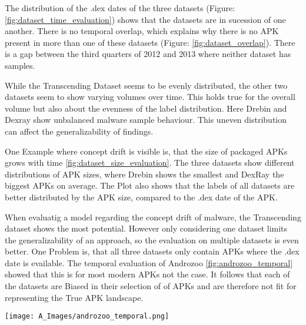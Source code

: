The distribution of the .dex dates of the three datasets (Figure: \ref{fig:dataset_time_evaluation}) shows that the datasets are in sucession of one another. 
There is no temporal overlap, which explains why there is no APK present in more than one of these datasets (Figure: \ref{fig:dataset_overlap}). 
There is a gap between the third quarters of 2012 and 2013 where neither dataset has samples. 

While the Transcending Dataset seems to be evenly distributed, the other two datasets seem to show varying volumes over time. 
This holds true for the overall volume but also about the evenness of the label distribution. 
Here Drebin and Dexray show unbalanced malware sample behaviour. 
This uneven distribution can affect the generalizability of findings.

One Example where concept drift is visible is, that the size of packaged APKs grows with time \ref{fig:dataset_size_evaluation}.
The three datasets show different distributions of APK sizes, where Drebin shows the smallest and DexRay the biggest APKs on average.
The Plot also shows that the labels of all datasets are better distributed by the APK size, compared to the .dex date of the APK.

When evaluatig a model regarding the concept drift of malware, the Transcending dataset shows the most potential.
However only considering one dataset limits the generalizability of an approach, so the evaluation on multiple datasets is even better.
One Problem is, that all three datasets only contain APKs where the .dex date is evailable.
The temporal evaluation of Androzoo \ref{fig:androzoo_temporal} showed that this is for most modern APKs not the case.
It follows that each of the datasets are Biased in their selection of of APKs and are therefore not fit for representing the True APK landscape. 



\begin{figure*}[b!]
    \centering
    \begin{minipage}{1.5\textwidth}
        \centering
        \texttt{[image: A\_Images/androzoo\_temporal.png]}
        \captionsetup{width=\textwidth}
        \caption{\label{fig:androzoo_temporal}
        Temporal distribution of APKs based on three key attributes: 
        classes.dex metadata, Virustotal Scan, and Androzoo Added. 
        The red bars (classes.dex metadata) show a large spike in 1980 to 1982, 
        likely due to incorrect or missing metadata values. 
        The blue (year of first scan by virustotal on that APK) and 
        green (year this APK was added to the androzoo repository) bars 
        indicate a consistent increase in APK activity from 2010 onward, 
        peaking around 2020 to 2022, reflecting the growing adoption of Android 
        and corresponding malware collection efforts. 
        The discrepancies between attributes highlight potential issues in 
        dataset metadata accuracy and consistency.
        }
    \end{minipage}
\end{figure*}


